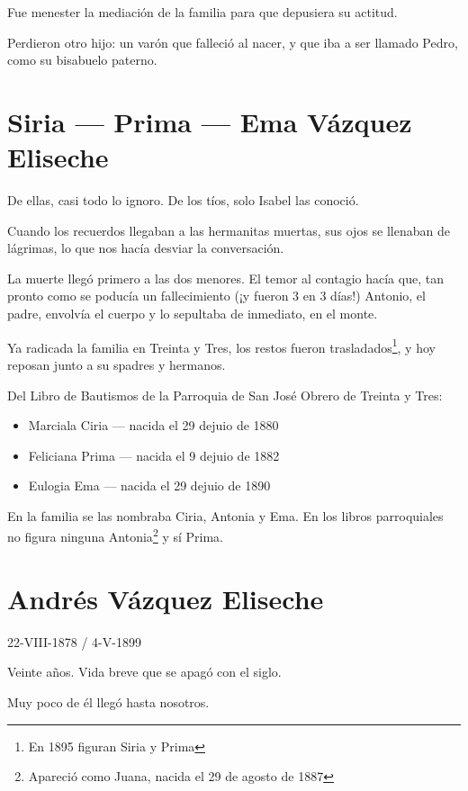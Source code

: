 \documentclass[a4paper]{article}
\begin{document}
Fue menester la mediación de la familia para que depusiera su actitud.

\bigbreak{}

Perdieron otro hijo: un varón que falleció al nacer, y que iba a ser llamado Pedro, como su bisabuelo paterno.

\section{Siria --- Prima --- Ema Vázquez Eliseche}

De ellas, casi todo lo ignoro. De los tíos, solo Isabel las conoció.

Cuando los recuerdos llegaban a las hermanitas muertas, sus ojos se llenaban de lágrimas, lo que nos hacía desviar la conversación.

La muerte llegó primero a las dos menores. El temor al contagio hacía que, tan pronto como se poducía un fallecimiento (¡y fueron 3 en 3 días!) Antonio, el padre, envolvía el cuerpo y lo sepultaba de inmediato, en el monte.

Ya radicada la familia en Treinta y Tres, los restos fueron trasladados\footnote{En 1895 figuran Siria y Prima}, y hoy reposan junto a su spadres y hermanos.

\bigbreak{}

Del Libro de Bautismos de la Parroquia de San José Obrero de Treinta y Tres:

\begin{itemize}
    \item{Marciala Ciria --- nacida el 29 dejuio de 1880}
    \item{Feliciana Prima --- nacida el 9 dejuio de 1882}
    \item{Eulogia Ema --- nacida el 29 dejuio de 1890}
\end{itemize}

En la familia se las nombraba Ciria, Antonia y Ema. En los libros parroquiales no figura ninguna Antonia\footnote{Apareció como Juana, nacida el 29 de agosto de 1887} y sí Prima.

\section{Andrés Vázquez Eliseche}

22-VIII-1878 / 4-V-1899

\bigbreak{}

Veinte años. Vida breve que se apagó con el siglo.

Muy poco de él llegó hasta nosotros.
\end{document}
